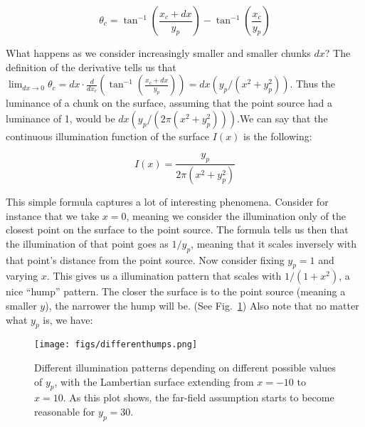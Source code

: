 $$\theta_c = \tan^{-1}\left(\frac{x_c+dx}{y_p}\right) - \tan^{-1}\left(\frac{x_c}{y_p}\right)$$

    What happens as we consider increasingly smaller and smaller chunks $dx$? The definition of the derivative tells us that $\lim_{dx \rightarrow 0} \theta_c = dx \cdot \frac{d}{dx_c}(\tan^{-1}(\frac{x_c+dx}{y_p})) = dx (y_p/(x^2 + y_p^2))$. Thus the luminance of a chunk on the surface, assuming that the point source had a luminance of 1, would be $dx (y_p/(2\pi(x^2 + y_p^2)))$.\footnotemark We can say that the continuous illumination function of the surface $I(x)$ is the following:
    
    $$I(x) = \frac{y_p}{2\pi(x^2 + y_p^2)}$$
    
    This simple formula captures a lot of interesting phenomena. Consider for instance that we take $x = 0$, meaning we consider the illumination only of the closest point on the surface to the point source. The formula tells us then that the illumination of that point goes as $1/y_p$, meaning that it scales inversely with that point's distance from the point source. Now consider fixing $y_p = 1$ and varying $x$. This gives us a illumination pattern that scales with $1/(1+x^2)$, a nice ``hump'' pattern. The closer the surface is to the point source (meaning a smaller $y$), the narrower the hump will be. (See Fig.~\ref{fig:differenthumps}) Also note that no matter what $y_p$ is, we have:

\begin{figure}
\begin{center}
\texttt{[image: figs/differenthumps.png]}
\caption{Different illumination patterns depending on different possible values of $y_p$, with the Lambertian surface extending from $x=-10$ to $x=10$. As this plot shows, the far-field assumption starts to become reasonable for $y_p = 30$. \label{fig:differenthumps}}
\end{center}
\end{figure}
    
    
